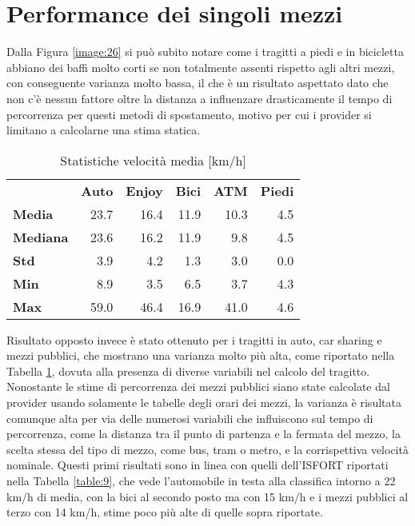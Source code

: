 \section{Performance dei singoli mezzi}

Dalla Figura  \ref{image:26} si può subito notare come i tragitti a piedi e in bicicletta abbiano dei baffi molto corti se non totalmente assenti rispetto agli altri mezzi, con conseguente varianza molto bassa, il che è un risultato aspettato dato che non c'è nessun fattore oltre la distanza a influenzare drasticamente il tempo di percorrenza per questi metodi di spostamento, motivo per cui i provider si limitano a calcolarne una stima statica.

\begin{table}
	\centering
	\begin{tabular}{ | l r r r r r | }
		\hline
		& \textbf{Auto} & \textbf{Enjoy} & \textbf{Bici} & \textbf{ATM} & \textbf{Piedi} \\
		\textbf{Media}      & 23.7 & 16.4 & 11.9 & 10.3 & 4.5 \\
		\textbf{Mediana} & 23.6 & 16.2 & 11.9 &   9.8 & 4.5 \\
		\textbf{Std}             &  3.9 &   4.2 &   1.3 &    3.0 & 0.0 \\
		\textbf{Min}            &  8.9 &   3.5 &   6.5 &    3.7 & 4.3 \\
		\textbf{Max}         & 59.0 & 46.4 & 16.9 &  41.0 & 4.6 \\
		\hline
	\end{tabular}
	\caption{Statistiche velocità media [km/h]}
	\label{table:3}
\end{table}

 Risultato opposto invece è stato ottenuto per i tragitti in auto, car sharing e mezzi pubblici, che mostrano una varianza molto più alta, come riportato nella Tabella \ref{table:3}, dovuta alla presenza di diverse variabili nel calcolo del tragitto. Nonostante le stime di percorrenza dei mezzi pubblici siano state calcolate dal provider usando solamente le tabelle degli orari dei mezzi, la varianza è risultata comunque alta per via delle numerosi variabili che influiscono sul tempo di percorrenza, come la distanza tra il punto di partenza e la fermata del mezzo, la scelta stessa del tipo di mezzo, come bus, tram o metro, e la corrispettiva velocità nominale. Questi primi risultati sono in linea con quelli dell'ISFORT riportati nella Tabella \ref{table:9}, che vede l'automobile in testa alla classifica intorno a 22 km/h di media, con la bici al secondo posto ma con 15 km/h e i mezzi pubblici al terzo con 14 km/h, stime poco più alte di quelle sopra riportate.

